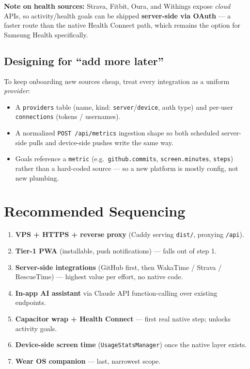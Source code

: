 \documentclass[11pt,a4paper]{article}
\begin{document}
\begin{notebox}
\textbf{Note on health sources:} Strava, Fitbit, Oura, and Withings expose
\emph{cloud} APIs, so activity/health goals can be shipped \textbf{server-side via
OAuth} --- a faster route than the native Health Connect path, which remains the
option for Samsung Health specifically.
\end{notebox}

\subsection{Designing for ``add more later''}
To keep onboarding new sources cheap, treat every integration as a uniform
\emph{provider}:
\begin{itemize}
  \item A \texttt{providers} table (name, kind: \texttt{server}/\texttt{device}, auth
        type) and per-user \texttt{connections} (tokens / usernames).
  \item A normalized \texttt{POST /api/metrics} ingestion shape so both scheduled
        server-side pulls and device-side pushes write the same way.
  \item Goals reference a \texttt{metric} (e.g.\ \texttt{github.commits},
        \texttt{screen.minutes}, \texttt{steps}) rather than a hard-coded source ---
        so a new platform is mostly config, not new plumbing.
\end{itemize}

\section{Recommended Sequencing}

\begin{enumerate}
  \item \textbf{VPS + HTTPS + reverse proxy} (Caddy serving \texttt{dist/}, proxying \texttt{/api}).
  \item \textbf{Tier-1 PWA} (installable, push notifications) --- falls out of step 1.
  \item \textbf{Server-side integrations} (GitHub first, then WakaTime / Strava / RescueTime)
        --- highest value per effort, no native code.
  \item \textbf{In-app AI assistant} via Claude API function-calling over existing endpoints.
  \item \textbf{Capacitor wrap + Health Connect} --- first real native step; unlocks activity goals.
  \item \textbf{Device-side screen time} (\texttt{UsageStatsManager}) once the native layer exists.
  \item \textbf{Wear OS companion} --- last, narrowest scope.
\end{enumerate}
\end{document}

